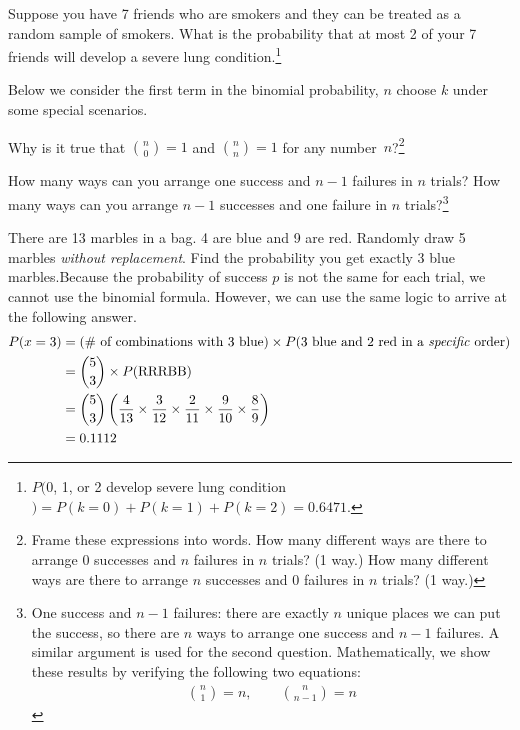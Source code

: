 \begin{exercise}
Suppose you have 7 friends who are smokers and they can be treated as a random sample of smokers. What is the probability that at most 2 of your 7 friends will develop a severe lung condition.\footnote{$P($0, 1, or 2 develop severe lung condition$) = P(k=0) + P(k=1)+P(k=2) = 0.6471$.}
\end{exercise}

Below we consider the first term in the binomial probability, $n$ choose $k$ under some special scenarios.

\begin{exercise}
Why is it true that ${n \choose 0}=1$ and ${n \choose n}=1$ for any \mbox{number~$n$}?\footnote{Frame these expressions into words. How many different ways are there to arrange 0 successes and $n$ failures in $n$ trials? (1 way.) How many different ways are there to arrange $n$ successes and 0 failures in $n$ trials? (1 way.)}
\end{exercise}

\begin{exercise}
How many ways can you arrange one success and $n-1$ failures in $n$ trials? How many ways can you arrange $n-1$ successes and one failure in $n$ trials?\footnote{One success and $n-1$ failures: there are exactly $n$ unique places we can put the success, so there are $n$ ways to arrange one success and $n-1$ failures. A similar argument is used for the second question. Mathematically, we show these results by verifying the following two equations:
\begin{eqnarray*}
{n \choose 1} = n, \qquad {n \choose n-1} = n
\end{eqnarray*}}
\end{exercise}

\begin{example}{There are 13 marbles in a bag.  4 are blue and 9 are red.  Randomly draw 5 marbles \emph{without replacement}.  Find the probability you get exactly 3 blue marbles.}Because the probability of success $p$ is not the same for each trial, we cannot use the binomial formula.  However, we can use the same logic to arrive at the following answer.  
\begin{align*}
P(x = 3) &= (\text{\# of combinations with 3 blue})\times P(\text{3 blue and 2 red in a \emph{specific} order}) \\
&={5\choose 3}\times P(\text{RRRBB}) \\
&= {5\choose 3}\left(\frac{4}{13}\times \frac{3}{12}\times \frac{2}{11} \times \frac{9}{10} \times \frac{8}{9}\right) \\
&= 0.1112
\end{align*}
\end{example}



